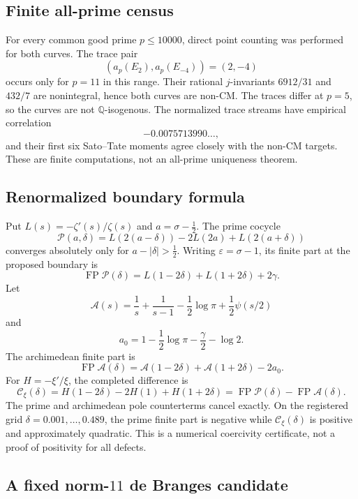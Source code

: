 \subsection{Finite all-prime census}

For every common good prime $p\le10000$, direct point counting was performed
for both curves. The trace pair
\[
 (a_p(E_2),a_p(E_{-4}))=(2,-4)
\]
occurs only for $p=11$ in this range. Their rational $j$-invariants
$6912/31$ and $432/7$ are nonintegral, hence both curves are non-CM. The
traces differ at $p=5$, so the curves are not $\mathbb Q$-isogenous. The
normalized trace streams have empirical correlation
\[
 -0.0075713990\ldots,
\]
and their first six Sato--Tate moments agree closely with the non-CM targets.
These are finite computations, not an all-prime uniqueness theorem.

\subsection{Renormalized boundary formula}

Put $L(s)=-\zeta'(s)/\zeta(s)$ and $a=\sigma-\tfrac12$. The prime cocycle
\[
 \mathcal P(a,\delta)
 =L(2(a-\delta))-2L(2a)+L(2(a+\delta))
\]
converges absolutely only for $a-|\delta|>\tfrac12$. Writing
$\varepsilon=\sigma-1$, its finite part at the proposed boundary is
\begin{equation}
 \operatorname{FP}\mathcal P(\delta)
 =L(1-2\delta)+L(1+2\delta)+2\gamma.
 \label{eq:prime_boundary_fp}
\end{equation}
Let
\[
 \mathcal A(s)=\frac1s+\frac1{s-1}-\frac12\log\pi
 +\frac12\psi(s/2)
\]
and
\[
 a_0=1-\frac12\log\pi-\frac\gamma2-\log2.
\]
The archimedean finite part is
\[
 \operatorname{FP}\mathcal A(\delta)
 =\mathcal A(1-2\delta)+\mathcal A(1+2\delta)-2a_0.
\]
For $H=-\xi'/\xi$, the completed difference is
\begin{equation}
 \mathcal C_\xi(\delta)
 =H(1-2\delta)-2H(1)+H(1+2\delta)
 =\operatorname{FP}\mathcal P(\delta)
  -\operatorname{FP}\mathcal A(\delta).
 \label{eq:completed_boundary_defect}
\end{equation}
The prime and archimedean pole counterterms cancel exactly. On the registered
grid $\delta=0.001,\ldots,0.489$, the prime finite part is negative while
$\mathcal C_\xi(\delta)$ is positive and approximately quadratic. This is a
numerical coercivity certificate, not a proof of positivity for all defects.

\subsection{A fixed norm-$11$ de Branges candidate}

